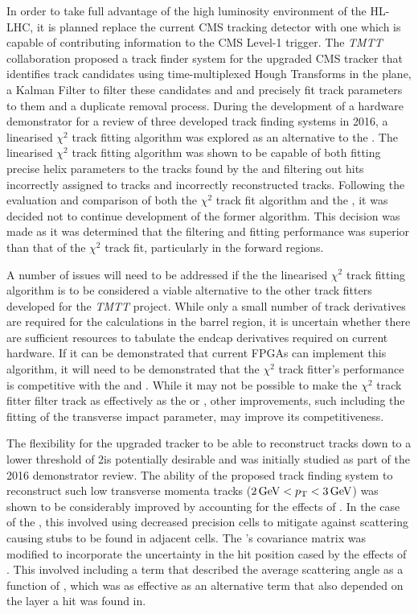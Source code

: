 In order to take full advantage of the high luminosity environment of the HL-LHC, it is planned replace the current CMS tracking detector with one which is capable of contributing information to the CMS Level-1 trigger.
The \emph{TMTT} collaboration proposed a track finder system for the upgraded CMS tracker that identifies track candidates using time-multiplexed Hough Transforms in the \rphi plane, a Kalman Filter to filter these candidates and and precisely fit track parameters to them and a duplicate removal process.
During the development of a hardware demonstrator for a review of three developed track finding systems in 2016, a linearised $\chi^{2}$ track fitting algorithm was explored as an alternative to the \KF.
The linearised $\chi^{2}$ track fitting algorithm was shown to be capable of both fitting precise helix parameters to the tracks found by the \HT and filtering out hits incorrectly assigned to tracks and incorrectly reconstructed tracks.
Following the evaluation and comparison of both the $\chi^{2}$ track fit algorithm and the \KF, it was decided not to continue development of the former algorithm.
This decision was made as it was determined that the \KF filtering and fitting performance was superior than that of the $\chi^{2}$ track fit, particularly in the forward regions.

A number of issues will need to be addressed if the the linearised $\chi^{2}$ track fitting algorithm is to be considered a viable alternative to the other track fitters developed for the \emph{TMTT} project.
While only a small number of track derivatives are required for the calculations in the barrel region, it is uncertain whether there are sufficient resources to tabulate the endcap derivatives required on current hardware.
If it can be demonstrated that current FPGAs can implement this algorithm, it will need to be demonstrated that the $\chi^{2}$ track fitter's performance is competitive with the \KF and \LR.
While it may not be possible to make the $\chi^{2}$ track fitter filter track as effectively as the \KF or \LR , other improvements, such including the fitting of the transverse impact parameter, may improve its competitiveness.



The flexibility for the upgraded tracker to be able to reconstruct tracks down to a lower \pT threshold of 2\GeV is potentially desirable and was initially studied as part of the 2016 demonstrator review.
The ability of the proposed track finding system to reconstruct such low transverse momenta tracks ($2\,\text{Ge\hspace{-.08em}V} < p_{\mathrm{T}} < 3\,\text{Ge\hspace{-.08em}V}$) was shown to be considerably improved by accounting for the effects of \MS. 
In the case of the \HT, this involved using decreased precision \HT cells to mitigate against scattering causing stubs to be found in adjacent cells.
The \KF's covariance matrix was modified to incorporate the uncertainty in the hit position cased by the effects of \MS.
This involved including a term that described the average scattering angle as a function of \pT, which was as effective as an alternative term that also depended on the layer a hit was found in.

